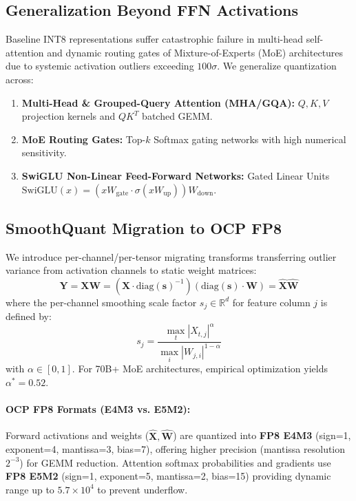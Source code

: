 \documentclass[10pt,twocolumn,letterpaper]{article}
\begin{document}
\subsection{Generalization Beyond FFN Activations}
Baseline INT8 representations suffer catastrophic failure in multi-head self-attention and dynamic routing gates of Mixture-of-Experts (MoE) architectures due to systemic activation outliers exceeding $100\sigma$. We generalize quantization across:
\begin{enumerate}
    \item \textbf{Multi-Head \& Grouped-Query Attention (MHA/GQA):} $Q, K, V$ projection kernels and $QK^T$ batched GEMM.
    \item \textbf{MoE Routing Gates:} Top-$k$ Softmax gating networks with high numerical sensitivity.
    \item \textbf{SwiGLU Non-Linear Feed-Forward Networks:} Gated Linear Units $\text{SwiGLU}(x) = (xW_{\text{gate}} \cdot \sigma(xW_{\text{up}})) W_{\text{down}}$.
\end{enumerate}

\subsection{SmoothQuant Migration to OCP FP8}
We introduce per-channel/per-tensor migrating transforms transferring outlier variance from activation channels to static weight matrices:
\begin{equation}
\mathbf{Y} = \mathbf{X} \mathbf{W} = \left( \mathbf{X} \cdot \text{diag}(\mathbf{s})^{-1} \right) \left( \text{diag}(\mathbf{s}) \cdot \mathbf{W} \right) = \mathbf{\hat{X}} \mathbf{\hat{W}}
\end{equation}
where the per-channel smoothing scale factor $s_j \in \mathbb{R}^{d}$ for feature column $j$ is defined by:
\begin{equation}
s_j = \frac{\max_{t} |X_{t, j}|^{\alpha}}{\max_{i} |W_{j, i}|^{1 - \alpha}}
\end{equation}
with $\alpha \in [0, 1]$. For 70B+ MoE architectures, empirical optimization yields $\alpha^* = 0.52$.

\paragraph{OCP FP8 Formats (E4M3 vs. E5M2):} Forward activations and weights ($\mathbf{\hat{X}}, \mathbf{\hat{W}}$) are quantized into \textbf{FP8 E4M3} (sign=1, exponent=4, mantissa=3, bias=7), offering higher precision (mantissa resolution $2^{-3}$) for GEMM reduction. Attention softmax probabilities and gradients use \textbf{FP8 E5M2} (sign=1, exponent=5, mantissa=2, bias=15) providing dynamic range up to $5.7 \times 10^4$ to prevent underflow.
\end{document}
